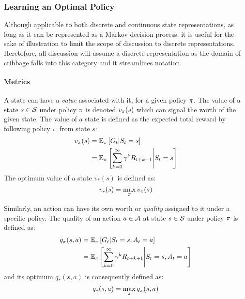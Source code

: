 \subsubsection*{Learning an Optimal Policy}


%
Although applicable to both discrete and continuous state representations,
as long as it can be represented as a Markov decision process,
it is useful for the sake of illustration to limit the scope of discussion to
discrete representations.
%
Heretofore, %
all discussion will assume a discrete representation
as the domain of cribbage falls into this category
and it streamlines notation.

\paragraph*{Metrics}


A state can have a \textit{value} associated with it,
for a given policy $\pi$.
%
The value of a state $s \in \mathcal{S}$ under policy $\pi$ is denoted
$v_\pi(s)$
which can signal the worth of the given state.
%
The value of a state
is defined as the expected total reward by following policy $\pi$ from
state $s$:
\begin{align*}
	v_\pi(s) &= \mathbb{E}_\pi\left[G_t \middle| S_t = s\right] \\
		&= \mathbb{E}_\pi \left[
				\sum_{k=0}^{\infty} \gamma^k R_{t+k+1} \middle| S_t = s
			\right]
\end{align*}
%
The optimum value of a state $v_*(s)$ is defined as:
\[ v_*(s) = \max_\pi v_\pi(s) \]

Similarly,
an action can have its own worth or \textit{quality} assigned to it under a
specific policy.
%
The quality of an action $a\in\mathcal{A}$ at state $s\in\mathcal{S}$ under policy
$\pi$ is defined as:
\begin{align*}
	q_\pi(s,a)
		&= \mathbb{E}_\pi\left[ G_t \middle| S_t = s, A_t = a \right]
		\\
		&= \mathbb{E}_\pi\left[
				\sum_{k=0}^{\infty}\gamma^k R_{t+k+1} \middle| S_t = s, A_t = a
			\right]
\end{align*}
and its optimum $q_*(s,a)$ is consequently defined as:
\[
	q_*(s,a) = \max_{\pi}q_\pi(s,a)
\]

